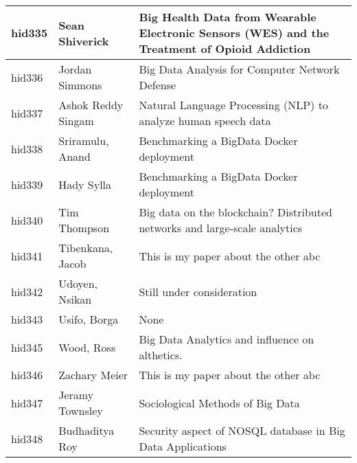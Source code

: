 \documentclass[12pt]{book}
\begin{document}
\begin{footnotesize}
\begin{longtable}{|p{1cm}p{5cm}p{9cm}|}
\hline
hid335 & Sean Shiverick & Big Health Data from Wearable Electronic Sensors (WES) and the Treatment of Opioid Addiction
  \\
\hline
hid336 & Jordan Simmons & Big Data Analysis for Computer Network Defense  \\
\hline
hid337 & Ashok Reddy Singam & Natural Language Processing (NLP) to analyze human speech data  \\
\hline
hid338 & Sriramulu, Anand & Benchmarking a BigData Docker deployment  \\
\hline
hid339 & Hady Sylla & Benchmarking a BigData Docker deployment  \\
\hline
hid340 & Tim Thompson & Big data on the blockchain? Distributed networks and large-scale analytics  \\
\hline
hid341 & Tibenkana, Jacob & This is my paper about the other abc  \\
\hline
hid342 & Udoyen, Nsikan & Still under consideration  \\
\hline
hid343 & Usifo, Borga & None  \\
\hline
hid345 & Wood, Ross & Big Data Analytics and influence on althetics.  \\
\hline
hid346 & Zachary Meier & This is my paper about the other abc  \\
\hline
hid347 & Jeramy Townsley & Sociological Methods of Big Data  \\
\hline
hid348 & Budhaditya Roy & Security aspect of NOSQL database in Big Data Applications  \\
\hline
\end{longtable}
\end{footnotesize}
\newpage
\end{document}
